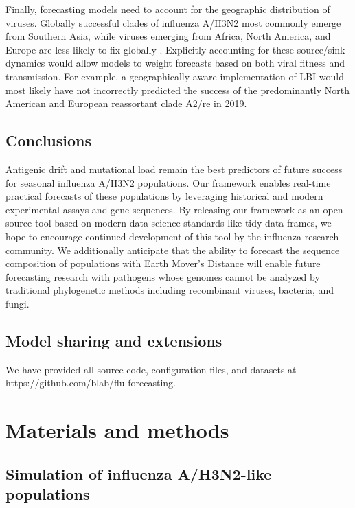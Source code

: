 Finally, forecasting models need to account for the geographic distribution of viruses.
Globally successful clades of influenza A/H3N2 most commonly emerge from Southern Asia, while viruses emerging from Africa, North America, and Europe are less likely to fix globally \cite{Russell:2008ke,Rambaut:2008ew,Bedford:2015fj}.
Explicitly accounting for these source/sink dynamics would allow models to weight forecasts based on both viral fitness and transmission.
For example, a geographically-aware implementation of LBI would most likely have not incorrectly predicted the success of the predominantly North American and European reassortant clade A2/re in 2019.

\subsection*{Conclusions}

Antigenic drift and mutational load remain the best predictors of future success for seasonal influenza A/H3N2 populations.
Our framework enables real-time practical forecasts of these populations by leveraging historical and modern experimental assays and gene sequences.
By releasing our framework as an open source tool based on modern data science standards like tidy data frames, we hope to encourage continued development of this tool by the influenza research community.
We additionally anticipate that the ability to forecast the sequence composition of populations with Earth Mover's Distance will enable future forecasting research with pathogens whose genomes cannot be analyzed by traditional phylogenetic methods including recombinant viruses, bacteria, and fungi.

\subsection*{Model sharing and extensions}

We have provided all source code, configuration files, and datasets at https://github.com/blab/flu-forecasting.

\section*{Materials and methods}

\subsection*{Simulation of influenza A/H3N2-like populations}

